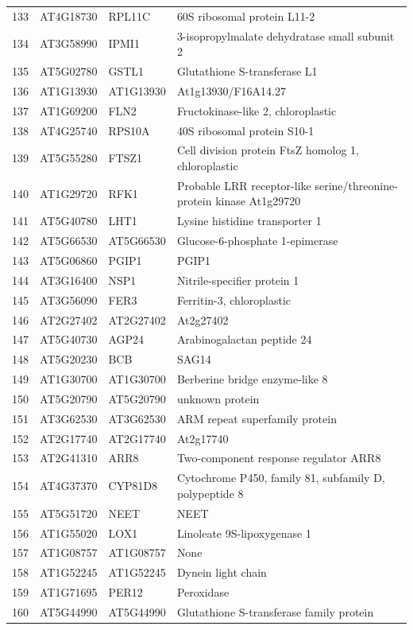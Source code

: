 \documentclass[11pt]{article}
\begin{document}
\begin{center}
\begin{tabular}{rlll}
133 & AT4G18730 & RPL11C & 60S ribosomal protein L11-2\\
134 & AT3G58990 & IPMI1 & 3-isopropylmalate dehydratase small subunit 2\\
135 & AT5G02780 & GSTL1 & Glutathione S-transferase L1\\
136 & AT1G13930 & AT1G13930 & At1g13930/F16A14.27\\
137 & AT1G69200 & FLN2 & Fructokinase-like 2, chloroplastic\\
138 & AT4G25740 & RPS10A & 40S ribosomal protein S10-1\\
139 & AT5G55280 & FTSZ1 & Cell division protein FtsZ homolog 1, chloroplastic\\
140 & AT1G29720 & RFK1 & Probable LRR receptor-like serine/threonine-protein kinase At1g29720\\
141 & AT5G40780 & LHT1 & Lysine histidine transporter 1\\
142 & AT5G66530 & AT5G66530 & Glucose-6-phosphate 1-epimerase\\
143 & AT5G06860 & PGIP1 & PGIP1\\
144 & AT3G16400 & NSP1 & Nitrile-specifier protein 1\\
145 & AT3G56090 & FER3 & Ferritin-3, chloroplastic\\
146 & AT2G27402 & AT2G27402 & At2g27402\\
147 & AT5G40730 & AGP24 & Arabinogalactan peptide 24\\
148 & AT5G20230 & BCB & SAG14\\
149 & AT1G30700 & AT1G30700 & Berberine bridge enzyme-like 8\\
150 & AT5G20790 & AT5G20790 & unknown protein\\
151 & AT3G62530 & AT3G62530 & ARM repeat superfamily protein\\
152 & AT2G17740 & AT2G17740 & At2g17740\\
153 & AT2G41310 & ARR8 & Two-component response regulator ARR8\\
154 & AT4G37370 & CYP81D8 & Cytochrome P450, family 81, subfamily D, polypeptide 8\\
155 & AT5G51720 & NEET & NEET\\
156 & AT1G55020 & LOX1 & Linoleate 9S-lipoxygenase 1\\
157 & AT1G08757 & AT1G08757 & None\\
158 & AT1G52245 & AT1G52245 & Dynein light chain\\
159 & AT1G71695 & PER12 & Peroxidase\\
160 & AT5G44990 & AT5G44990 & Glutathione S-transferase family protein\\

\end{tabular}
\end{center}
\end{document}
